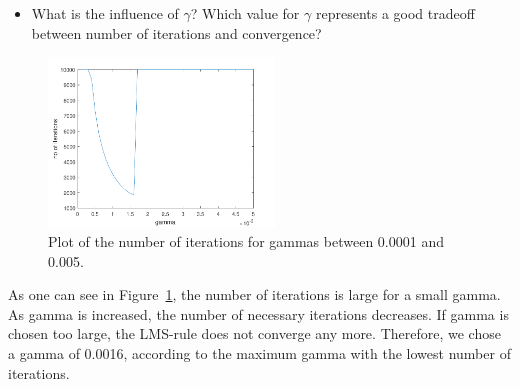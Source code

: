 \documentclass[a4]{article}
\begin{document}
\begin{itemize}	
	\item What is the influence of $\gamma$? Which value for $\gamma$ represents a good tradeoff between number of iterations and convergence? 
\end{itemize}
\begin{figure}[!h]
	\begin{center}
		\centering
		\includegraphics[width=6cm]{../figures/bestGamma.pdf}
	\end{center}
	\caption{\label{fig:bestGamma} Plot of the number of iterations for gammas between 0.0001 and 0.005.}
\end{figure}
As one can see in Figure~\ref{fig:bestGamma}, the number of iterations is large for a small gamma. As gamma is increased, the number of necessary iterations decreases. If gamma is chosen too large, the LMS-rule does not converge any more.
Therefore, we chose a gamma of 0.0016, according to the maximum gamma with the lowest number of iterations. 
\end{document}
